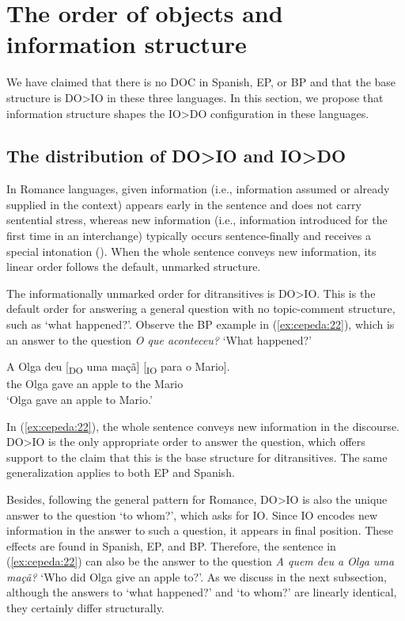 \documentclass[output=paper,colorlinks,citecolor=brown,nonflat]{./langscibook}
\begin{document}
\section{The order of objects and information structure}\label{sec:cepeda:3}

We have claimed that there is no DOC in Spanish, EP, or BP and that the base structure is DO>IO in these three languages. In this section, we propose that information structure shapes the IO>DO configuration in these languages.

\subsection{The distribution of DO>IO and IO>DO}\label{sec:cepeda:3.1}

In Romance languages, given information (i.e., information assumed or already supplied in the context) appears early in the sentence and does not carry sentential stress, whereas new information (i.e., information introduced for the first time in an interchange) typically occurs sentence-finally and receives a special intonation (\citealt{Zubizarreta1998}). When the whole sentence conveys new information, its linear order follows the default, unmarked structure.

The informationally unmarked order for ditransitives is DO>IO. This is the default order for answering a general question with no topic-comment structure, such as ‘what happened?’. Observe the BP example in (\ref{ex:cepeda:22}), which is an answer to the question \textit{O que aconteceu?} ‘What happened?’

\ea%
    \label{ex:cepeda:22}
	\gll A   Olga deu [\textsubscript{DO} uma maçã] [\textsubscript{IO} para o   Mario].\\
		the Olga gave \hspaceThis{[\textsubscript{DO}} an apple \hspaceThis{[\textsubscript{IO}} to the Mario\\
	\glt ‘Olga gave an apple to Mario.’
\z

In (\ref{ex:cepeda:22}), the whole sentence conveys new information in the discourse. DO>IO is the only appropriate order to answer the question, which offers support to the claim that this is the base structure for ditransitives. The same generalization applies to both EP and Spanish.

Besides, following the general pattern for Romance, DO>IO is also the unique answer to the question ‘to whom?’, which asks for IO. Since IO encodes new information in the answer to such a question, it appears in final position. These effects are found in Spanish, EP, and BP. Therefore, the sentence in (\ref{ex:cepeda:22}) can also be the answer to the question \textit{A quem deu a Olga uma maçã?} ‘Who did Olga give an apple to?’. As we discuss in the next subsection, although the answers to ‘what happened?’ and ‘to whom?’ are linearly identical, they certainly differ structurally.
\end{document}
